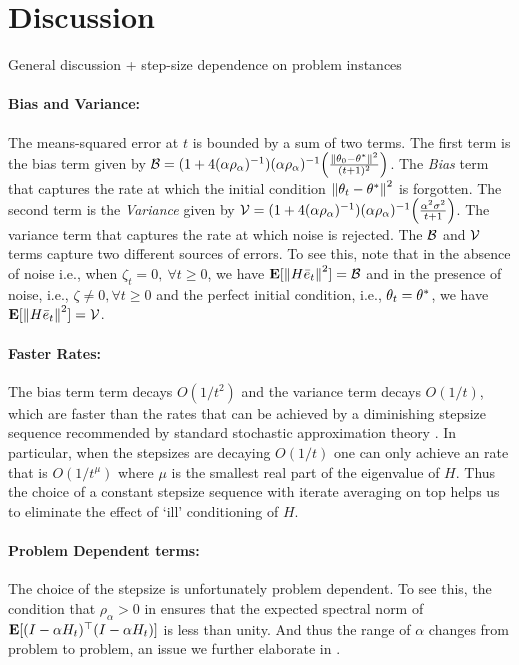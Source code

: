 \section{Discussion}
\label{sec:discussion}
General discussion + step-size dependence on problem instances

\paragraph{Bias and Variance:} The means-squared error at $t$ is bounded by a sum of two terms. The first term is the bias term given by $\mathcal{B}=(1+4(\alpha\rho_{\alpha})^{-1}) (\alpha\rho_{\alpha})^{-1} \Big(\frac{\left\| \theta_0-\theta^*\right\|^2}{(t+1)^2}\Big)$.  The \emph{Bias} term that captures the rate at which the initial condition $\left\| \theta_t-\theta^*\right\|^2$ is forgotten. The second term is the \emph{Variance} given by $\mathcal{V}=(1+4(\alpha\rho_{\alpha})^{-1}) (\alpha\rho_{\alpha})^{-1} \Big(\frac{\alpha^2\sigma^2}{t+1} \Big)$. The variance term that captures the rate at which noise is rejected. The $\mathcal{B}$ and $\mathcal{V}$ terms capture two different sources of errors. To see this, note that in the absence of noise i.e., when $\zeta_t=0,~\forall t\geq 0$, we have $\mathbf{E}[\left\| H\bar{e}_t\right\|^2]=\mathcal{B}$ and in the presence of noise, i.e., $\zeta\neq 0,\forall t\geq 0$ and the perfect initial condition, i.e., $\theta_t=\theta^*$, we have $\mathbf{E}[\left\| H\bar{e}_t\right\|^2]=\mathcal{V}$.

\paragraph{Faster Rates:} The bias term term decays $O(1/t^2)$ and the variance term decays $O(1/t)$, which are faster than the rates that can be achieved by a diminishing stepsize sequence recommended by standard stochastic approximation theory \cite{SA}. In particular, when the stepsizes are decaying $O(1/t)$ one can only achieve an rate that is $O(1/t^\mu)$ where $\mu$ is the smallest real part of the eigenvalue of $H$. Thus the choice of a constant stepsize sequence with iterate averaging on top helps us to eliminate the effect of `ill' conditioning of $H$.

\paragraph{Problem Dependent terms:} The choice of the stepsize is unfortunately problem dependent. To see this, the condition that $\rho_{\alpha}>0$ in  ensures that the expected spectral norm of $\mathbf{E}[(I-\alpha H_t)^\top(I-\alpha H_t)]$ is less than unity. And thus the range of $\alpha$ changes from problem to problem, an issue we further elaborate in .

